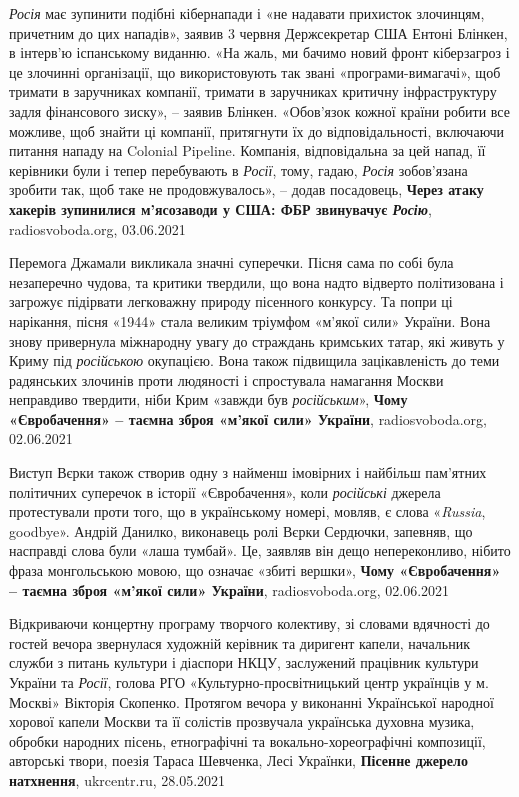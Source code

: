 \emph{Росія} має зупинити подібні кібернапади і «не надавати прихисток злочинцям,
причетним до цих нападів», заявив 3 червня Держсекретар США Ентоні Блінкен, в
інтерв'ю іспанському виданню.  «На жаль, ми бачимо новий фронт кіберзагроз і це
злочинні організації, що використовують так звані «програми-вимагачі», щоб
тримати в заручниках компанії, тримати в заручниках критичну інфраструктуру
задля фінансового зиску», – заявив Блінкен. «Обов'язок кожної країни робити
все можливе, щоб знайти ці компанії, притягнути їх до відповідальності,
включаючи питання нападу на Colonial Pipeline. Компанія, відповідальна за цей
напад, її керівники були і тепер перебувають в \emph{Росії}, тому, гадаю, \emph{Росія}
зобов'язана зробити так, щоб таке не продовжувалось», – додав посадовець,
\textbf{Через атаку хакерів зупинилися м'ясозаводи у США: ФБР звинувачує \emph{Росію}},
radiosvoboda.org, 03.06.2021

Перемога Джамали викликала значні суперечки. Пісня сама по собі була
незаперечно чудова, та критики твердили, що вона надто відверто політизована і
загрожує підірвати легковажну природу пісенного конкурсу. Та попри ці
нарікання, пісня «1944» стала великим тріумфом «м'якої сили» України. Вона
знову привернула міжнародну увагу до страждань кримських татар, які живуть у
Криму під \emph{російською} окупацією. Вона також підвищила зацікавленість до теми
радянських злочинів проти людяності і спростувала намагання Москви неправдиво
твердити, ніби Крим «завжди був \emph{російським}»,
\textbf{Чому «Євробачення» – таємна зброя «м'якої сили» України}, radiosvoboda.org, 02.06.2021

Виступ Вєрки також створив одну з найменш імовірних і найбільш пам'ятних
політичних суперечок в історії «Євробачення», коли \emph{російські} джерела
протестували проти того, що в українському номері, мовляв, є слова «\emph{Russia},
goodbye». Андрій Данилко, виконавець ролі Вєрки Сердючки, запевняв, що
насправді слова були «лаша тумбай». Це, заявляв він дещо непереконливо, нібито
фраза монгольською мовою, що означає «збиті вершки»,
\textbf{Чому «Євробачення» – таємна зброя «м'якої сили» України}, radiosvoboda.org, 02.06.2021

Відкриваючи концертну програму творчого колективу, зі словами вдячності до
гостей вечора звернулася художній керівник та диригент капели, начальник служби
з питань культури і діаспори НКЦУ, заслужений працівник культури України та
\emph{Росії}, голова РГО «Культурно-просвітницький центр українців у м. Москві»
Вікторія Скопенко.  Протягом вечора у виконанні Української народної хорової
капели Москви та її солістів прозвучала українська духовна музика, обробки
народних пісень, етнографічні та вокально-хореографічні композиції, авторські
твори, поезія Тараса Шевченка, Лесі Українки,
\textbf{Пісенне джерело натхнення}, ukrcentr.ru, 28.05.2021

